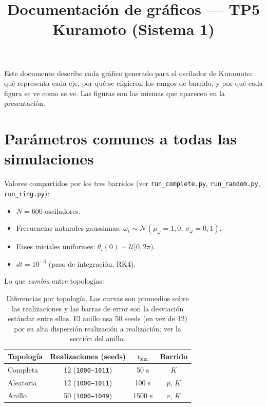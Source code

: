 \documentclass[11pt,a4paper]{article}
\title{Documentación de gráficos --- TP5 Kuramoto (Sistema 1)}
\author{}
\date{}
\begin{document}
\maketitle

Este documento describe cada gráfico generado para el oscilador de Kuramoto:
qué representa cada eje, por qué se eligieron los rangos de barrido, y por qué
cada figura se ve como se ve. Las figuras son las mismas que aparecen en la
presentación.

\section{Parámetros comunes a todas las simulaciones}

Valores compartidos por los tres barridos (ver \texttt{run\_complete.py},
\texttt{run\_random.py}, \texttt{run\_ring.py}):

\begin{itemize}
  \item $N = 600$ osciladores.
  \item Frecuencias naturales gaussianas: $\omega_i \sim \mathcal{N}(\mu_\omega=1{,}0,\ \sigma_\omega=0{,}1)$.
  \item Fases iniciales uniformes: $\theta_i(0) \sim \mathcal{U}[0, 2\pi)$.
  \item $dt = 10^{-3}$ (paso de integración, RK4).
\end{itemize}

Lo que \emph{cambia} entre topologías:

\begin{table}[H]
  \centering
  \begin{tabular}{lccc}
    \toprule
    \textbf{Topología} & \textbf{Realizaciones (seeds)} & $t_{\text{sim}}$ & \textbf{Barrido} \\
    \midrule
    Completa  & 12 (\texttt{1000--1011}) & 50 s   & $K$ \\
    Aleatoria & 12 (\texttt{1000--1011}) & 100 s  & $p$, $K$ \\
    Anillo    & 50 (\texttt{1000--1049}) & 1500 s & $v$, $K$ \\
    \bottomrule
  \end{tabular}
  \caption{Diferencias por topología. Las curvas son promedios sobre las
  realizaciones y las barras de error son la desviación estándar entre ellas.
  El anillo usa 50 seeds (en vez de 12) por su alta dispersión realización a
  realización; ver la sección del anillo.}
\end{table}
\end{document}
